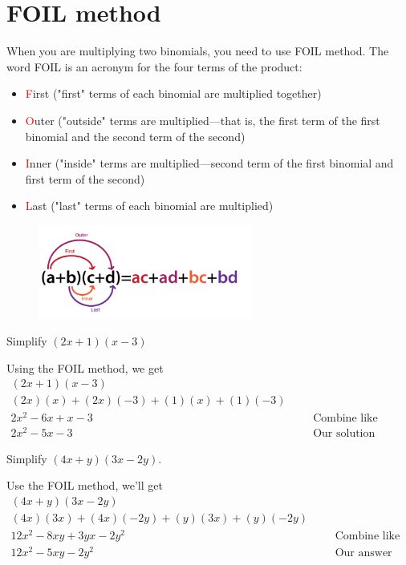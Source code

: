  \section{FOIL method}
 When you are multiplying two binomials, you need to use FOIL method.
 The word FOIL is an acronym for the four terms of the product:
\begin{itemize}
    \item \textcolor{red}{F}irst ("first" terms of each binomial are multiplied together)
    \item \textcolor{red}{O}uter ("outside" terms are multiplied—that is, the first term of the first binomial and the second term of the second)
    \item \textcolor{red}{I}nner ("inside" terms are multiplied—second term of the
    first binomial and first term of the second)
    \item \textcolor{red}{L}ast ("last" terms of each binomial are multiplied) 
\end{itemize}
\begin{figure}[ht]
    \centering
    \includegraphics[width=7cm]{pics/foil-method-formula.png}
    \label{fig:foil}
\end{figure}
\begin{exa}
    Simplify $(2x+1)(x-3)$
\end{exa}
Using the FOIL method, we get
\begin{align*}
    (2x+1)(x-3)& \\
    (2x)(x)+(2x)(-3)+(1)(x)+(1)(-3)& \\
    2x^2-6x+x-3&    &   &\text{Combine like terms}\\
    2x^2-5x-3& &&\text{Our solution}
\end{align*}
\begin{exa}
    Simplify $(4x+y)(3x-2y)$.
\end{exa}
Use the FOIL method, we'll get
\begin{align*}
    (4x+y)(3x-2y)&  &&\\
    (4x)(3x)+(4x)(-2y)+(y)(3x)+(y)(-2y)& &&\\
    12x^2-8xy+3yx-2y^2& &&\text{Combine like terms}\\
    12x^2-5xy-2y^2 &    &&\text{Our answer}
\end{align*}
